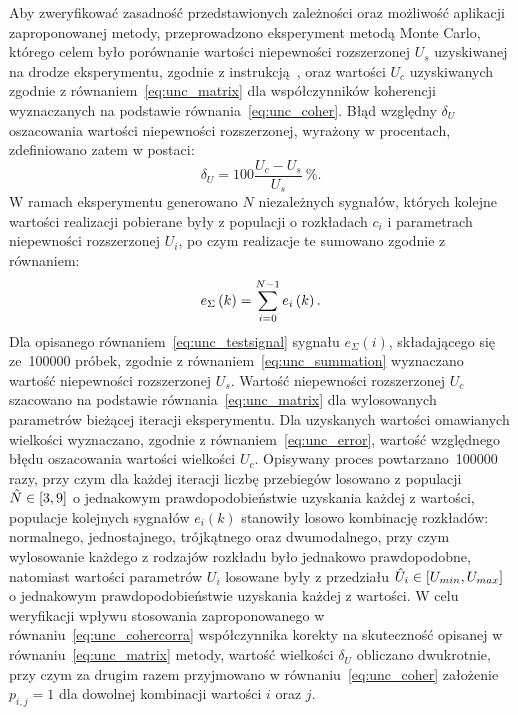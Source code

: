 Aby zweryfikować zasadność przedstawionych zależności oraz możliwość aplikacji zaproponowanej metody, przeprowadzono eksperyment metodą Monte Carlo, którego celem było porównanie wartości niepewności rozszerzonej $U_{s}$ uzyskiwanej na drodze eksperymentu, zgodnie z instrukcją~\cite{jcgm_montecarlo}, oraz wartości $U_{c}$ uzyskiwanych zgodnie z równaniem~\eqref{eq:unc_matrix} dla współczynników koherencji wyznaczanych na podstawie równania~\eqref{eq:unc_coher}. Błąd względny $\delta_{U}$ oszacowania wartości niepewności rozszerzonej, wyrażony w procentach, zdefiniowano zatem w postaci:
\begin{equation}
\delta_{U} = 100 \frac{U_{c} - U_{s}}{U_{s}}~\unit{\percent} \label{eq:unc_error}.
\end{equation}
W ramach eksperymentu generowano $N$ niezależnych sygnałów, których kolejne wartości realizacji pobierane były z populacji o rozkładach $c_{i}$ i parametrach niepewności rozszerzonej $U_{i}$, po czym realizacje te sumowano zgodnie z równaniem:
\begin{equation}
e_{\Sigma} \left(k\right) = \sum _{i=0} ^{N-1} e_{i} \left(k\right) \label{eq:unc_testsignal}.
\end{equation}
Dla opisanego równaniem~\eqref{eq:unc_testsignal} sygnału $e_{\Sigma}(i)$, składającego się ze~\num{100000} próbek, zgodnie z równaniem~\eqref{eq:unc_summation} wyznaczano wartość niepewności rozszerzonej $U_{s}$. Wartość niepewności rozszerzonej $U_{c}$ szacowano na podstawie równania~\eqref{eq:unc_matrix} dla wylosowanych parametrów bieżącej iteracji eksperymentu. Dla uzyskanych wartości omawianych wielkości wyznaczano, zgodnie z równaniem~\eqref{eq:unc_error}, wartość względnego błędu oszacowania wartości wielkości $U_{c}$. Opisywany proces powtarzano~\num{100000} razy, przy czym dla każdej iteracji liczbę przebiegów losowano z populacji $\hat{N} \in \interval{3}{9}$ o jednakowym prawdopodobieństwie uzyskania każdej z wartości, populacje kolejnych sygnałów $e_{i}(k)$ stanowiły losowo kombinację rozkładów: normalnego, jednostajnego, trójkątnego oraz dwumodalnego, przy czym wylosowanie każdego z rodzajów rozkładu było jednakowo prawdopodobne, natomiast wartości parametrów $U_{i}$ losowane były z przedziału $\hat{U}_{i} \in \interval{U_{min}}{U_{max}}$ o jednakowym prawdopodobieństwie uzyskania każdej z wartości. W celu weryfikacji wpływu stosowania zaproponowanego w równaniu~\eqref{eq:unc_cohercorra} współczynnika korekty na skuteczność opisanej w równaniu~\eqref{eq:unc_matrix} metody, wartość wielkości $\delta_{U}$ obliczano dwukrotnie, przy czym za drugim razem przyjmowano w równaniu~\eqref{eq:unc_coher} założenie $p_{i,j} = 1$ dla dowolnej kombinacji wartości $i$ oraz $j$.

